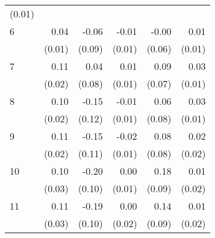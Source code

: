 \begin{tabular}{llllll}
  \multicolumn{1}{r}{(0.01)} \\
\multicolumn{1}{l}{6} &
  \multicolumn{1}{|r}{0.04} &
  \multicolumn{1}{r}{-0.06} &
  \multicolumn{1}{r}{-0.01} &
  \multicolumn{1}{r}{-0.00} &
  \multicolumn{1}{r}{0.01} \\
\multicolumn{1}{l}{} &
  \multicolumn{1}{|r}{(0.01)} &
  \multicolumn{1}{r}{(0.09)} &
  \multicolumn{1}{r}{(0.01)} &
  \multicolumn{1}{r}{(0.06)} &
  \multicolumn{1}{r}{(0.01)} \\
\multicolumn{1}{l}{7} &
  \multicolumn{1}{|r}{0.11} &
  \multicolumn{1}{r}{0.04} &
  \multicolumn{1}{r}{0.01} &
  \multicolumn{1}{r}{0.09} &
  \multicolumn{1}{r}{0.03} \\
\multicolumn{1}{l}{} &
  \multicolumn{1}{|r}{(0.02)} &
  \multicolumn{1}{r}{(0.08)} &
  \multicolumn{1}{r}{(0.01)} &
  \multicolumn{1}{r}{(0.07)} &
  \multicolumn{1}{r}{(0.01)} \\
\multicolumn{1}{l}{8} &
  \multicolumn{1}{|r}{0.10} &
  \multicolumn{1}{r}{-0.15} &
  \multicolumn{1}{r}{-0.01} &
  \multicolumn{1}{r}{0.06} &
  \multicolumn{1}{r}{0.03} \\
\multicolumn{1}{l}{} &
  \multicolumn{1}{|r}{(0.02)} &
  \multicolumn{1}{r}{(0.12)} &
  \multicolumn{1}{r}{(0.01)} &
  \multicolumn{1}{r}{(0.08)} &
  \multicolumn{1}{r}{(0.01)} \\
\multicolumn{1}{l}{9} &
  \multicolumn{1}{|r}{0.11} &
  \multicolumn{1}{r}{-0.15} &
  \multicolumn{1}{r}{-0.02} &
  \multicolumn{1}{r}{0.08} &
  \multicolumn{1}{r}{0.02} \\
\multicolumn{1}{l}{} &
  \multicolumn{1}{|r}{(0.02)} &
  \multicolumn{1}{r}{(0.11)} &
  \multicolumn{1}{r}{(0.01)} &
  \multicolumn{1}{r}{(0.08)} &
  \multicolumn{1}{r}{(0.02)} \\
\multicolumn{1}{l}{10} &
  \multicolumn{1}{|r}{0.10} &
  \multicolumn{1}{r}{-0.20} &
  \multicolumn{1}{r}{0.00} &
  \multicolumn{1}{r}{0.18} &
  \multicolumn{1}{r}{0.01} \\
\multicolumn{1}{l}{} &
  \multicolumn{1}{|r}{(0.03)} &
  \multicolumn{1}{r}{(0.10)} &
  \multicolumn{1}{r}{(0.01)} &
  \multicolumn{1}{r}{(0.09)} &
  \multicolumn{1}{r}{(0.02)} \\
\multicolumn{1}{l}{11} &
  \multicolumn{1}{|r}{0.11} &
  \multicolumn{1}{r}{-0.19} &
  \multicolumn{1}{r}{0.00} &
  \multicolumn{1}{r}{0.14} &
  \multicolumn{1}{r}{0.01} \\
\multicolumn{1}{l}{} &
  \multicolumn{1}{|r}{(0.03)} &
  \multicolumn{1}{r}{(0.10)} &
  \multicolumn{1}{r}{(0.02)} &
  \multicolumn{1}{r}{(0.09)} &
  \multicolumn{1}{r}{(0.02)} \\

\end{tabular}
